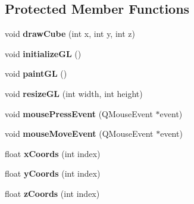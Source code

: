 \subsection*{Protected Member Functions}
\begin{DoxyCompactItemize}
\item 
\hypertarget{class_matrix_widget_a11dff2ead5ef6f4f09528cd33fc8c1ff}{void {\bfseries draw\+Cube} (int x, int y, int z)}\label{class_matrix_widget_a11dff2ead5ef6f4f09528cd33fc8c1ff}

\item 
\hypertarget{class_matrix_widget_aaf91ee7b7b9d6f2497b6b1f982bf2585}{void {\bfseries initialize\+G\+L} ()}\label{class_matrix_widget_aaf91ee7b7b9d6f2497b6b1f982bf2585}

\item 
\hypertarget{class_matrix_widget_a72e5ef9c915cfe97da589fcdd87c89bb}{void {\bfseries paint\+G\+L} ()}\label{class_matrix_widget_a72e5ef9c915cfe97da589fcdd87c89bb}

\item 
\hypertarget{class_matrix_widget_afcf4d2da8449cfe3681913183f52671f}{void {\bfseries resize\+G\+L} (int width, int height)}\label{class_matrix_widget_afcf4d2da8449cfe3681913183f52671f}

\item 
\hypertarget{class_matrix_widget_aa4566c137db014cf83f5fe309b4d125f}{void {\bfseries mouse\+Press\+Event} (Q\+Mouse\+Event $\ast$event)}\label{class_matrix_widget_aa4566c137db014cf83f5fe309b4d125f}

\item 
\hypertarget{class_matrix_widget_a654d8f69e0ec87c19bdc11646b4887ff}{void {\bfseries mouse\+Move\+Event} (Q\+Mouse\+Event $\ast$event)}\label{class_matrix_widget_a654d8f69e0ec87c19bdc11646b4887ff}

\item 
\hypertarget{class_matrix_widget_a767e048f16f9c6cac59ab5ba68a4de1f}{float {\bfseries x\+Coords} (int index)}\label{class_matrix_widget_a767e048f16f9c6cac59ab5ba68a4de1f}

\item 
\hypertarget{class_matrix_widget_a84a270b0c96df951e8580df88381a7e4}{float {\bfseries y\+Coords} (int index)}\label{class_matrix_widget_a84a270b0c96df951e8580df88381a7e4}

\item 
\hypertarget{class_matrix_widget_a8f975ec0baa66415ad61be2166c16c7c}{float {\bfseries z\+Coords} (int index)}\label{class_matrix_widget_a8f975ec0baa66415ad61be2166c16c7c}


\end{DoxyCompactItemize}
